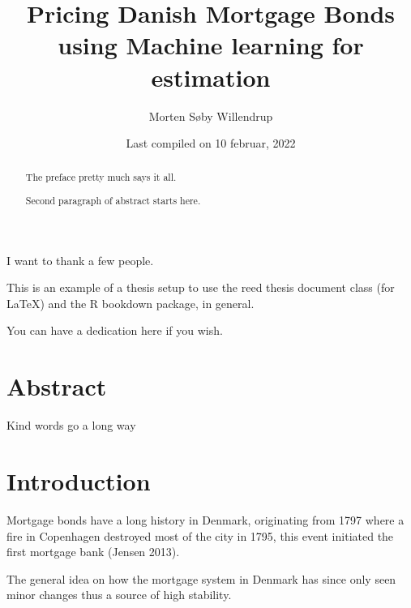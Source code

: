 \documentclass[12pt,twoside]{reedthesis}
\title{Pricing Danish Mortgage Bonds using Machine learning for estimation}
\author{Morten Søby Willendrup}
\date{Last compiled on 10 februar, 2022}
\begin{document}
  \maketitle

\frontmatter %
\pagestyle{empty} %
  \begin{acknowledgements}
    I want to thank a few people.
  \end{acknowledgements}
  \begin{preface}
    This is an example of a thesis setup to use the reed thesis document class
    (for LaTeX) and the R bookdown package, in general.
  \end{preface}
  \hypersetup{linkcolor=black}
  \setcounter{secnumdepth}{2}
  \setcounter{tocdepth}{2}
  \tableofcontents

  \listoftables

  \listoffigures
  \begin{abstract}
    The preface pretty much says it all.

    \par

    Second paragraph of abstract starts here.
  \end{abstract}
  \begin{dedication}
    You can have a dedication here if you wish.
  \end{dedication}
\mainmatter %
\pagestyle{fancyplain} %

\hypertarget{abstract}{%
\chapter*{Abstract}\label{abstract}}

Kind words go a long way

\hypertarget{intro}{%
\chapter{Introduction}\label{intro}}

Mortgage bonds have a long history in Denmark, originating from 1797 where a fire in Copenhagen destroyed most of the city in 1795, this event initiated the first mortgage bank (Jensen 2013).

The general idea on how the mortgage system in Denmark has since only seen minor changes thus a source of high stability.
\end{document}

